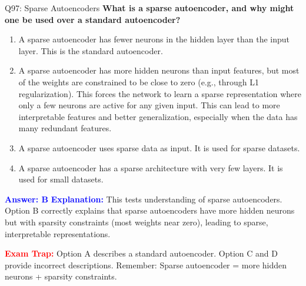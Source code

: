 \documentclass[8pt]{beamer}
\begin{document}
	\begin{frame}{Q97: Sparse Autoencoders}
		\fontsize{6.5}{7.5}\selectfont
		\textbf{What is a sparse autoencoder, and why might one be used over a standard autoencoder?}
		
		\begin{enumerate}
			\item A sparse autoencoder has fewer neurons in the hidden layer than the input layer. This is the standard autoencoder.
			\item A sparse autoencoder has more hidden neurons than input features, but most of the weights are constrained to be close to zero (e.g., through L1 regularization). This forces the network to learn a sparse representation where only a few neurons are active for any given input. This can lead to more interpretable features and better generalization, especially when the data has many redundant features.
			\item A sparse autoencoder uses sparse data as input. It is used for sparse datasets.
			\item A sparse autoencoder has a sparse architecture with very few layers. It is used for small datasets.
		\end{enumerate}
		
		\vspace{0.1cm}
		\textcolor{blue}{\textbf{Answer: B}}
		\vspace{0.1cm}
		\textcolor{blue}{\textbf{Explanation:}} This tests understanding of sparse autoencoders. Option B correctly explains that sparse autoencoders have more hidden neurons but with sparsity constraints (most weights near zero), leading to sparse, interpretable representations.
		
		\textcolor{red}{\textbf{Exam Trap:}} Option A describes a standard autoencoder. Option C and D provide incorrect descriptions. Remember: Sparse autoencoder = more hidden neurons + sparsity constraints.
	\end{frame}
	
\end{document}
